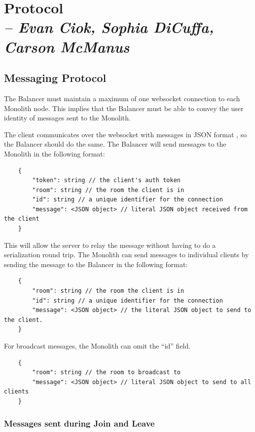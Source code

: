 \chapter{Protocol \\
  \small{\textit{-- Evan Ciok, Sophia DiCuffa, Carson McManus}}
  \label{Chapter::Protocol}}

\section{Messaging Protocol}

The Balancer must maintain a maximum of one websocket  connection to each Monolith  node. This implies that the Balancer  must be able to convey the user identity of messages sent to the Monolith.

The client communicates over the websocket with messages in JSON  format , so the Balancer should do the same. The Balancer will send messages to the Monolith in the following format:

\begin{verbatim}
	{
		"token": string // the client's auth token
		"room": string // the room the client is in
		"id": string // a unique identifier for the connection
		"message": <JSON object> // literal JSON object received from the client
	}
\end{verbatim}

This will allow the server to relay the message without having to do a serialization round trip. The Monolith can send messages to individual clients by sending the message to the Balancer in the following format:

\begin{verbatim}
	{
		"room": string // the room the client is in
		"id": string // a unique identifier for the connection
		"message": <JSON object> // the literal JSON object to send to the client.
	}
\end{verbatim}

For broadcast messages, the Monolith can omit the ``id'' field.

\begin{verbatim}
	{
		"room": string // the room to broadcast to
		"message": <JSON object> // literal JSON object to send to all clients
	}
\end{verbatim}



\subsection{Messages sent during Join and Leave}

